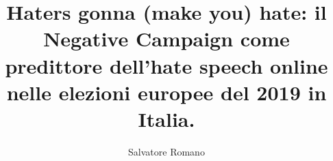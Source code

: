 \title{Haters gonna (make you) hate: il Negative Campaign come predittore dell'hate speech online nelle elezioni europee del 2019 in Italia.}
\author{Salvatore Romano}



